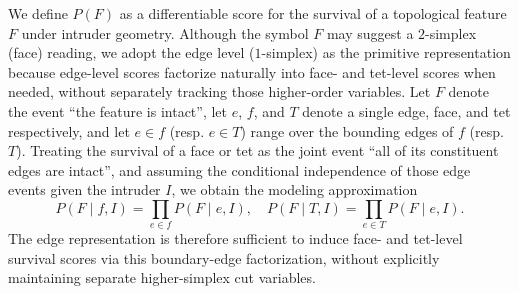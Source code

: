 \documentclass[letterpaper, 10 pt, conference]{ieeeconf}  %
\theoremstyle{tight}
\begin{document}
We define $P(F)$ as a differentiable score for the survival of a
topological feature $F$ under intruder geometry. Although the symbol
$F$ may suggest a $2$-simplex (face) reading, we adopt the edge level
($1$-simplex) as the primitive representation because edge-level
scores factorize naturally into face- and tet-level scores when
needed, without separately tracking those higher-order variables. Let
$F$ denote the event ``the feature is intact'', let $e$, $f$, and $T$
denote a single edge, face, and tet respectively, and let $e \in f$
(resp. $e \in T$) range over the bounding edges of $f$ (resp. $T$).
Treating the survival of a face or tet as the joint event ``all of
its constituent edges are intact'', and assuming the conditional
independence of those edge events given the intruder $I$, we obtain
the modeling approximation
\begin{equation}
  P(F \mid f, I) \!=\! \prod_{e \in f}\!P(F \mid e, I),
  \quad
  P(F \mid T, I) \!=\! \prod_{e \in T}\!P(F \mid e, I).
  \label{eq:simplicial-product}
\end{equation}
The edge representation is therefore sufficient to induce face- and
tet-level survival scores via this boundary-edge factorization,
without explicitly maintaining separate higher-simplex cut variables.
\end{document}
